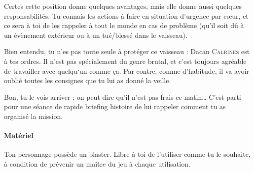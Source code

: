 \documentclass{article}
\begin{document}
{Certes cette position donne quelques avantages, mais elle donne aussi quelques responsabilités.
Tu connais les actions à faire en situation d’urgence par cœur, et ce sera à toi de les rappeler à tout le monde en cas de problème (qu’il soit dû à un évènement extérieur ou à un tué/blessé dans le vaisseau).

Bien entendu, tu n’es pas toute seule à protéger ce vaisseau : Dacan \textsc{Calrines} est à tes ordres.
Il n’est pas spécialement du genre brutal, et c’est toujours agréable de travailler avec quelqu‘un comme ça.
Par contre, comme d’habitude, il va avoir oublié toutes les consignes que tu lui as donné la veille.

Bon, tu le vois arriver ; on peut dire qu’il n’est pas frais ce matin…
C’est parti pour une séance de rapide briefing histoire de lui rappeler comment tu as organisé la mission.

\paragraph{Matériel}
{
Ton personnage possède un blaster.
Libre à toi de l’utiliser comme tu le souhaite, à condition de prévenir un maître du jeu à chaque utilisation.
}
}
\end{document}
